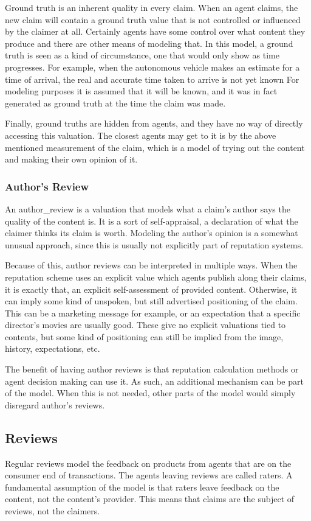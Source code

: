 \documentclass[%
    ]{\PathToTumTemplate/thesis/tum_thesis}
\begin{document}
Ground truth is an inherent quality in every claim.
When an agent claims, the new claim will contain a ground truth value that is not controlled or influenced by the claimer at all.
Certainly agents have some control over what content they produce and there are other means of modeling that.
In this model, a ground truth is seen as a kind of circumstance, one that would only show as time progresses.
For example, when the autonomous vehicle makes an estimate for a time of arrival, the real and accurate time taken to arrive is not yet known
For modeling purposes it is assumed that it will be known, and it was in fact generated as ground truth at the time the claim was made.

Finally, ground truths are hidden from agents, and they have no way of directly accessing this valuation.
The closest agents may get to it is by the above mentioned measurement of the claim, which is a model of trying out the content and making their own opinion of it.

\subsubsection{Author's Review}
An \gls{author_review} is a valuation that models what a claim's author says the quality of the content is.
It is a sort of self-appraisal, a declaration of what the claimer thinks its claim is worth.
Modeling the author's opinion is a somewhat unusual approach, since this is usually not explicitly part of reputation systems.

Because of this, author reviews can be interpreted in multiple ways.
When the reputation scheme uses an explicit value which agents publish along their claims, it is exactly that, an explicit self-assessment of provided content.
Otherwise, it can imply some kind of unspoken, but still advertised positioning of the claim.
This can be a marketing message for example, or an expectation that a specific director's movies are usually good.
These give no explicit valuations tied to contents, but some kind of positioning can still be implied from the image, history, expectations, etc.

The benefit of having author reviews is that reputation calculation methods or agent decision making can use it.
As such, an additional mechanism can be part of the model.
When this is not needed, other parts of the model would simply disregard author's reviews.


\subsection{Reviews}\label{sec:approach_reviews}
Regular reviews model the feedback on products from agents that are on the consumer end of transactions.
The agents leaving reviews are called raters.
A fundamental assumption of the model is that raters leave feedback on the content, not the content's provider.
This means that claims are the subject of reviews, not the claimers.
\end{document}
